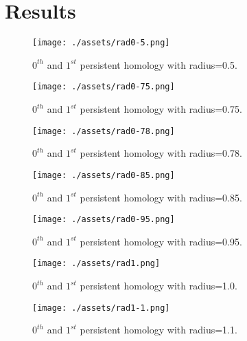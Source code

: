 \documentclass[letterpaper, 12pt]{report}
\begin{document}
	\newpage
	\section{Results}
	
	\begin{figure}[ht]
	  \centering
	  \texttt{[image: ./assets/rad0-5.png]}
	  \caption{$0^{th}$ and $1^{st}$ persistent homology with radius=0.5.}
	  \label{fig:fig1}
	\end{figure}
	
	\begin{figure}[ht]
	  \centering
	  \texttt{[image: ./assets/rad0-75.png]}
	  \caption{$0^{th}$ and $1^{st}$ persistent homology with radius=0.75.}
	  \label{fig:fig2}
	\end{figure}
	
	\begin{figure}[ht]
	  \centering
	  \texttt{[image: ./assets/rad0-78.png]}
	  \caption{$0^{th}$ and $1^{st}$ persistent homology with radius=0.78.}
	  \label{fig:fig3}
	\end{figure}
	
	\begin{figure}[ht]
	  \centering
	  \texttt{[image: ./assets/rad0-85.png]}
	  \caption{$0^{th}$ and $1^{st}$ persistent homology with radius=0.85.}
	  \label{fig:fig4}
	\end{figure}
	
	\begin{figure}[ht]
	  \centering
	  \texttt{[image: ./assets/rad0-95.png]}
	  \caption{$0^{th}$ and $1^{st}$ persistent homology with radius=0.95.}
	  \label{fig:fig5}
	\end{figure}

	\begin{figure}[ht]
	  \centering
	  \texttt{[image: ./assets/rad1.png]}
	  \caption{$0^{th}$ and $1^{st}$ persistent homology with radius=1.0.}
	  \label{fig:fig6}
	\end{figure}
	
	\begin{figure}[ht]
	  \centering
	  \texttt{[image: ./assets/rad1-1.png]}
	  \caption{$0^{th}$ and $1^{st}$ persistent homology with radius=1.1.}
	  \label{fig:fig7}
	\end{figure}
	
	
	\clearpage

	
\end{document}
